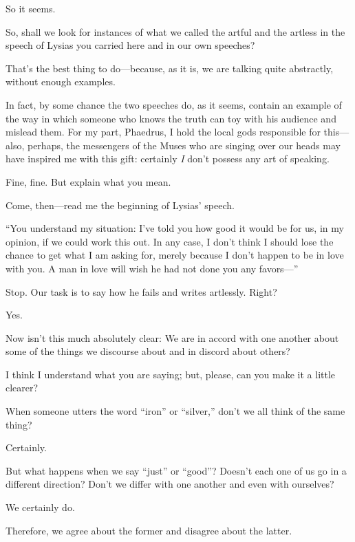 \sayphaedrus So it seems.

\saysocrates So, shall we look for instances of what we called the artful
and the artless in the speech of Lysias you carried here and in our own
speeches?

\sayphaedrus That’s the best thing to do---because, as it is, we are
talking quite abstractly, without enough examples.

\saysocrates In fact, by some chance the two speeches do, as it seems,
contain an example of the way in which someone who knows the truth 
can toy with his audience and mislead them. For my part,
Phaedrus, I hold the local gods responsible for this---also, perhaps,
the messengers of the Muses who are singing over our heads may have
inspired me with this gift: certainly {\em I} don’t possess any art of
speaking.

\sayphaedrus Fine, fine. But explain what you mean.

\saysocrates Come, then---read me the beginning of Lysias’ speech.

\sayphaedrus “You understand my situation: I’ve told you how good it 
would be for us, in my opinion, if we could work this out. In
any case, I don’t think I should lose the chance to get what I am asking
for, merely because I don’t happen to be in love with you. A man in love
will wish he had not done you any favors---”

\saysocrates Stop. Our task is to say how he fails and writes artlessly.
Right?

\sayphaedrus Yes.

\saysocrates Now isn’t this much absolutely clear: We are in accord with
one another about some of the things we discourse about and in discord
about others?

\sayphaedrus I think I understand what you are saying; but, please, can you
make it a little clearer?

\saysocrates When someone utters the word “iron” or “silver,” don’t we all
think of the same thing?

\sayphaedrus Certainly.

\saysocrates But what happens when we say “just” or “good”? Doesn’t each
one of us go in a different direction? Don’t we differ with one another
and even with ourselves?

\sayphaedrus We certainly do.

\saysocrates Therefore, we agree about the former and disagree
about the latter.

